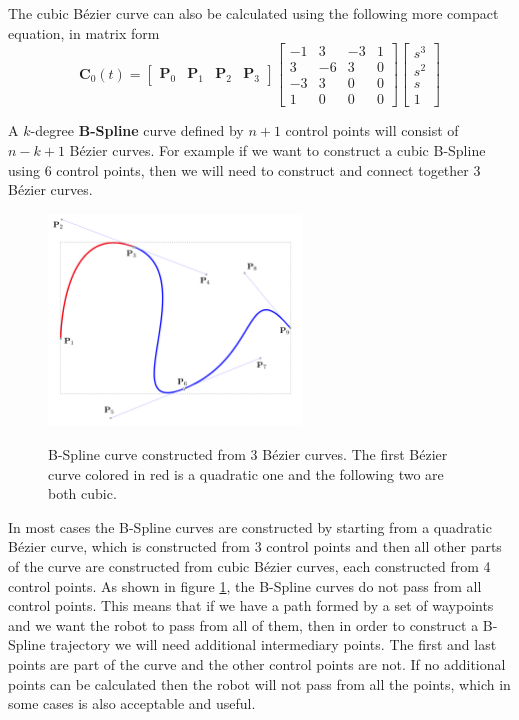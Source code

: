 The cubic B\'ezier curve can also be calculated using the following more compact equation, in matrix form
\begin{equation}
\mathbf{C}_0(t) = \begin{bmatrix} \mathbf{P}_0 & \mathbf{P}_1 & \mathbf{P}_2 & \mathbf{P}_3 \end{bmatrix} 
\begin{bmatrix} 
-1 & 3 & -3 & 1 \\
3 & -6 & 3 & 0 \\
-3 & 3 & 0 & 0 \\
1 & 0 & 0 & 0
\end{bmatrix}
\begin{bmatrix}
s^3 \\ s^2 \\ s \\ 1
\end{bmatrix}
\end{equation}

A $k$-degree \textbf{B-Spline} curve defined by $n+1$ control points will consist of $n-k+1$ B\'ezier curves. For example if we want to construct a cubic B-Spline using 6 control points, then we will need to construct 
and connect together 3 B\'ezier curves.

\begin{center}
\begin{figure}[H]
\centering
\includegraphics[width=0.6\textwidth]{images/b-spline-explanation.png}\\
\caption{B-Spline curve constructed from 3 B\'ezier curves. The first B\'ezier curve colored in red is a quadratic one and the following two are both cubic.} 
\label{b-spline-explanation}
\end{figure}
\end{center}

In most cases the B-Spline curves are constructed by starting from a quadratic B\'ezier curve, which is constructed from 3 control points and then all other 
parts of the curve are constructed from cubic B\'ezier curves, each constructed from 4 control points. As shown in figure \ref{b-spline-explanation}, the B-Spline 
curves do not pass from all control points. This means that if we have a path formed by a set of waypoints and we want the robot to pass from all of them, then 
in order to construct a B-Spline trajectory we will need additional intermediary points. The first and last points are part of the curve and the other control 
points are not. If no additional points can be calculated then the robot will not pass from all the points, which in some cases is also acceptable and useful.


